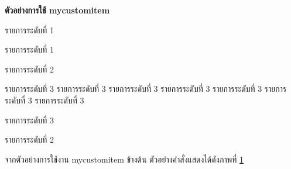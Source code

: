 \hspace*{1.5em} %
\textbf{ตัวอย่างการใช้ \textbf{mycustomitem}}
\begin{mycustomitem}
    \item รายการระดับที่ 1
    \item รายการระดับที่ 1
    \begin{mycustomitem}
        \item รายการระดับที่ 2
        \begin{mycustomitem}
            \item รายการระดับที่ 3 รายการระดับที่ 3 รายการระดับที่ 3 รายการระดับที่ 3 รายการระดับที่ 3 รายการระดับที่ 3 รายการระดับที่ 3 
            \item รายการระดับที่ 3
        \end{mycustomitem}
        \item รายการระดับที่ 2
    \end{mycustomitem}
\end{mycustomitem}


\hspace*{1.5em} %
จากตัวอย่างการใช้งาน mycustomitem ข้างต้น ตัวอย่างคำสั่งแสดงได้ดังภาพที่ \ref{fig3:ExampleCreateItem} 

\begin{figure}[htbp]
\centering
{}
\caption{}
\label{fig3:ExampleCreateItem}
\end{figure}


